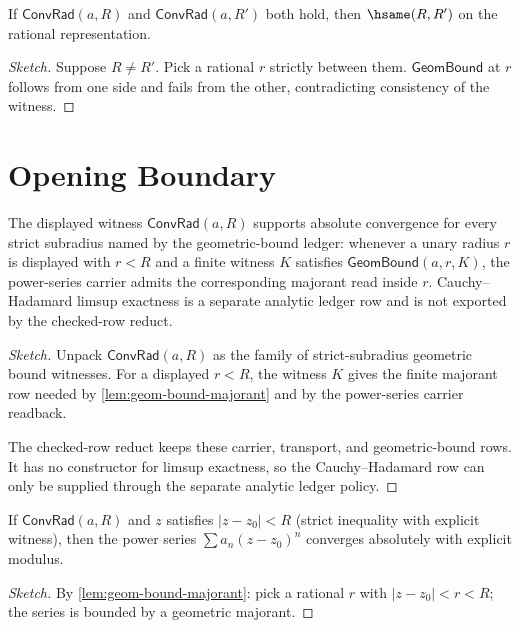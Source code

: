 \begin{theorem}
\label{thm:conv-rad-unique}
If \(\mathsf{ConvRad}(a, R)\) and \(\mathsf{ConvRad}(a, R')\) both hold, then \(\hsame(R, R')\) on the rational representation.
\end{theorem}
\begin{proof}[Sketch]
Suppose \(R \neq R'\). Pick a rational \(r\) strictly between them. \(\mathsf{GeomBound}\) at \(r\) follows from one side and fails from the other, contradicting consistency of the witness.
\end{proof}

\section{Opening Boundary}

\begin{theorem}
\label{thm:convergence-radius-opening-boundary-clarification}
The displayed witness $\mathsf{ConvRad}(a,R)$ supports absolute convergence
for every strict subradius named by the geometric-bound ledger: whenever a
unary radius $r$ is displayed with $r<R$ and a finite witness $K$ satisfies
$\mathsf{GeomBound}(a,r,K)$, the power-series carrier admits the corresponding
majorant read inside $r$. Cauchy--Hadamard limsup exactness is a separate
analytic ledger row and is not exported by the checked-row reduct.
\end{theorem}
\begin{proof}[Sketch]
Unpack $\mathsf{ConvRad}(a,R)$ as the family of strict-subradius geometric
bound witnesses. For a displayed $r<R$, the witness $K$ gives the finite
majorant row needed by \autoref{lem:geom-bound-majorant} and by the
power-series carrier readback.

The checked-row reduct keeps these carrier, transport, and geometric-bound
rows. It has no constructor for limsup exactness, so the Cauchy--Hadamard row
can only be supplied through the separate analytic ledger policy.
\end{proof}

\begin{theorem}
\label{thm:abs-conv-inside}
If \(\mathsf{ConvRad}(a, R)\) and \(z\) satisfies \(|z - z_0| < R\) (strict inequality with explicit witness), then the power series \(\sum a_n (z - z_0)^n\) converges absolutely with explicit modulus.
\end{theorem}
\begin{proof}[Sketch]
By \autoref{lem:geom-bound-majorant}: pick a rational \(r\) with \(|z - z_0| < r < R\); the series is bounded by a geometric majorant.
\end{proof}

